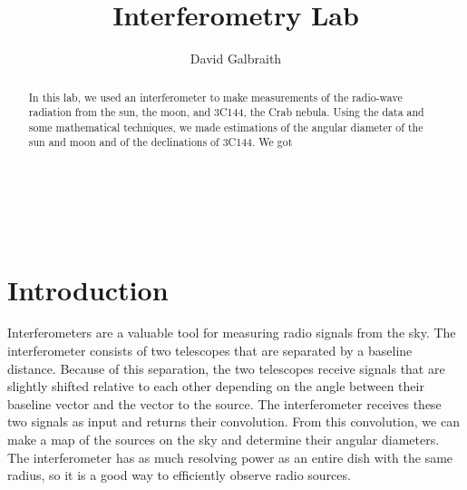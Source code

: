 \documentclass[11pt]{article}
\begin{document}
\title{Interferometry Lab}
\author{David Galbraith}
\maketitle

\normalsize
\begin{abstract} 
In this lab, we used an interferometer to make measurements of the radio-wave radiation from the sun, the moon, and 3C144, the Crab nebula. Using the data and some mathematical techniques, we made estimations of the angular diameter of the sun and moon and of the declinations of 3C144. We got  %
\end{abstract}


\medskip                        %

\thispagestyle{plain}

\section{Introduction}
Interferometers are a valuable tool for measuring radio signals from the sky. The interferometer consists of two telescopes that are separated by a baseline distance. Because of this separation, the two telescopes receive signals that are slightly shifted relative to each other depending on the angle between their baseline vector and the vector to the source. The interferometer receives these two signals as input and returns their convolution. From this convolution, we can make a map of the sources on the sky and determine their angular diameters. The interferometer has as much resolving power as an entire dish with the same radius, so it is a good way to efficiently observe radio sources.
\end{document}
